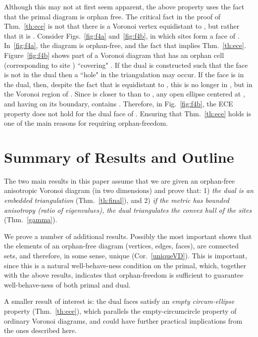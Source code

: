 \documentclass[11pt]{article}
\begin{document}
Although this may not at first seem apparent,
the above property uses the fact that the primal diagram is orphan free. 
The critical fact in the proof of Thm.~\ref{th:ece} is not that
there is a Voronoi vertex  equidistant to , but rather that 
it is . 
Consider Figs.~\ref{fig:f4a} and~\ref{fig:f4b}, in which sites  form a face of . 
In~\ref{fig:f4a}, the diagram is orphan-free, and the fact that  implies Thm.~\ref{th:ece}. 
Figure~\ref{fig:f4b} shows part of a Voronoi diagram that has an orphan cell (corresponding
to site ) ``covering" . 
If the dual is constructed such that the face  is not in the dual  
then a ``hole" in the triangulation may occur. 
If the face  is in the dual, 
then, 
despite the fact that  is equidistant
to , this  is no longer in , but in the Voronoi region
of . 
Since  is closer to  than to , 
any open ellipse centered at , and having
 on its boundary, contains .
Therefore, in Fig.~\ref{fig:f4b}, the ECE property does not hold for the dual
face of .  
Ensuring that Thm.~\ref{th:ece} holds is one of the main reasons for requiring orphan-freedom. 






\section{Summary of Results and Outline}

The two main results in this paper assume that we are given an orphan-free anisotropic Voronoi diagram (in two dimensions) and 
prove that: 1) \emph{the dual is an embedded triangulation} (Thm.~\ref{th:final}), 
and 2) \emph{if the metric has bounded anisotropy (ratio of eigenvalues), the dual triangulates the convex hull of the sites} (Thm.~\ref{gamma}).

We prove a number of additional results. Possibly the most important shows that the elements of an orphan-free diagram (vertices, edges, faces), 
are connected sets, and therefore, in some sense, unique (Cor.~\ref{uniqueVD}). 
This is important, since this is a natural well-behave-ness condition on the primal, which, together 
with the above results, indicates that orphan-freedom is sufficient to guarantee well-behave-ness of both primal and dual. 

A smaller result of interest is: the dual faces satisfy an \emph{empty circum-ellipse} property (Thm.~\ref{th:ece}), which parallels the empty-circumcircle property of ordinary Voronoi diagrams, 
and could have further practical implications from the ones described here. 
\end{document}
